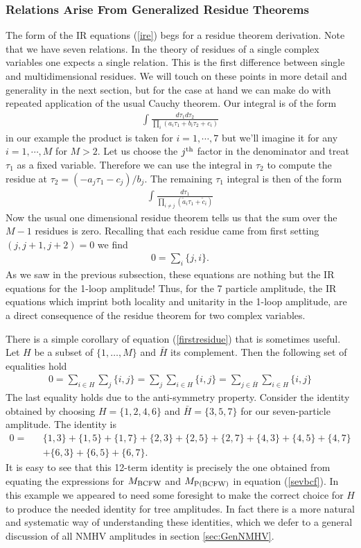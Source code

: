 \documentclass[12pt]{article}
\newcommand{\be}{\begin{eqnarray}}
\newcommand{\ee}{\end{eqnarray}}
\begin{document}
\subsubsection{Relations Arise From Generalized Residue Theorems}

The form of the IR equations (\ref{ire}) begs for a residue theorem derivation. Note that we have seven relations. In the theory of residues of a single complex variables one expects a single relation. This is the first difference between single and multidimensional residues. We will touch on these points in more detail and generality in the next section, but for the case at hand we can make do with repeated application of the usual Cauchy theorem. Our integral is of the form
%
\be
\int \frac{d\tau_1d\tau_2}{\prod_{i}(a_i \tau_1+b_i\tau_2 +c_i)}
\ee
%
in our example the product is taken for $i = 1, \cdots, 7$ but we'll imagine it for any $i=1, \cdots, M$ for $M > 2$.
Let us choose the $j^{\rm th}$ factor in the denominator and treat $\tau_1$ as a fixed variable. Therefore we can use the integral in $\tau_2$ to compute the residue at $\tau_2 = (-a_j\tau_1-c_j)/b_j$. The remaining $\tau_1$ integral is then of the form
 \be
 \int \frac{d\tau_1}{\prod_{i\neq j}(\tilde a_i \tau_1 + \tilde c_i)}
 \ee
Now the usual one dimensional residue theorem tells us that the sum over the $M-1$ residues is zero. Recalling that each residue came from first setting $(j,j+1,j+2)=0$ we find
\be
\label{firstresidue}
0 = \sum_{i}\{j,i\}.
\ee
As we saw in the previous subsection, these equations are nothing but the IR equations for the 1-loop amplitude! Thus, for the 7 particle amplitude, the IR equations which imprint both locality and unitarity in the 1-loop amplitude, are a direct consequence of the residue theorem for two complex variables.

There is a simple corollary of equation (\ref{firstresidue}) that is sometimes useful. Let $H$ be a subset of $\{1,\ldots, M\}$ and $\bar{H}$ its complement. Then the following set of equalities hold
%
\be
0 = \sum_{i\in H}\sum_{j}\{i,j\} = \sum_{j} \sum_{i\in H}\{i,j\} = \sum_{j\in \bar{H}}\sum_{i\in H}\{i,j\}
\ee
%
The last equality holds due to the anti-symmetry property. Consider the identity obtained by choosing $H =\{ 1,2,4,6\}$ and ${\bar H}=\{3,5,7\}$ for our seven-particle amplitude. The identity is
\begin{eqnarray}\nonumber
0 = && \{ 1,3\} +\{ 1,5\} +\{ 1,7\} +\{ 2,3\} +\{ 2,5\} +\{ 2,7\} + \{ 4,3\} +\{ 4,5\} +\{ 4,7\} \\ &&  +\{ 6,3\} +\{ 6,5\} +\{ 6,7\}.
\end{eqnarray}
%
It is easy to see that this 12-term identity is precisely the one obtained from equating the expressions for $M_{{\rm BCFW}}$ and $M_{{\rm P(BCFW)}}$ in equation (\ref{sevbcf}). In this example we appeared to need some foresight to make the correct choice for $H$ to produce the needed identity for tree amplitudes. In fact there is a more natural and systematic way of understanding these identities, which we defer to a general discussion of all NMHV amplitudes in section \ref{sec:GenNMHV}.
\end{document}
